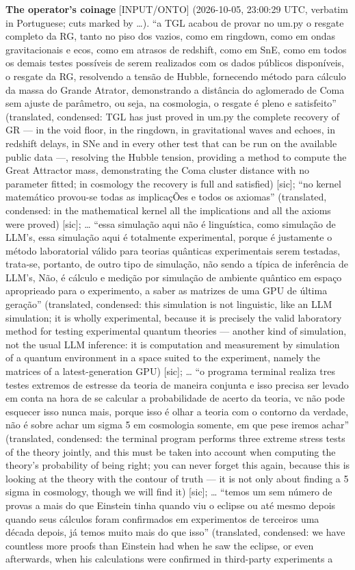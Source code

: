 \documentclass[11pt]{article}
\theoremstyle{definition}\newtheorem{deriv}{Derivation}
\begin{document}
\textbf{The operator's coinage} \textsf{[INPUT/ONTO]} (2026-10-05, 23:00:29 UTC, verbatim in Portuguese; cuts marked by …). ``a TGL acabou de provar no um.py o resgate completo da RG, tanto no piso dos vazios, como em ringdown, como em ondas gravitacionais e ecos, como em atrasos de redshift, como em SnE, como em todos os demais testes possíveis de serem realizados com os dados públicos disponíveis, o resgate da RG, resolvendo a tensão de Hubble, fornecendo método para cálculo da massa do Grande Atrator, demonstrando a distância do aglomerado de Coma sem ajuste de parâmetro, ou seja, na cosmologia, o resgate é pleno e satisfeito'' (translated, condensed: TGL has just proved in um.py the complete recovery of GR --- in the void floor, in the ringdown, in gravitational waves and echoes, in redshift delays, in SNe and in every other test that can be run on the available public data ---, resolving the Hubble tension, providing a method to compute the Great Attractor mass, demonstrating the Coma cluster distance with no parameter fitted; in cosmology the recovery is full and satisfied) [sic]; ``no kernel matemático provou-se todas as implicaçÕes e todos os axiomas'' (translated, condensed: in the mathematical kernel all the implications and all the axioms were proved) [sic]; … ``essa simulação aqui não é linguística, como simulação de LLM's, essa simulação aqui é totalmente experimental, porque é justamente o método laboratorial válido para teorias quânticas experimentais serem testadas, trata-se, portanto, de outro tipo de simulação, não sendo a típica de inferência de LLM's, Não, é cálculo e medição por simulação de ambiente quântico em espaço aproprieado para o experimento, a saber as matrizes de uma GPU de última geração'' (translated, condensed: this simulation is not linguistic, like an LLM simulation; it is wholly experimental, because it is precisely the valid laboratory method for testing experimental quantum theories --- another kind of simulation, not the usual LLM inference: it is computation and measurement by simulation of a quantum environment in a space suited to the experiment, namely the matrices of a latest-generation GPU) [sic]; … ``o programa terminal realiza tres testes extremos de estresse da teoria de maneira conjunta e isso precisa ser levado em conta na hora de se calcular a probabilidade de acerto da teoria, vc não pode esquecer isso nunca mais, porque isso é olhar a teoria com o contorno da verdade, não é sobre achar um sigma 5 em cosmologia somente, em que pese iremos achar'' (translated, condensed: the terminal program performs three extreme stress tests of the theory jointly, and this must be taken into account when computing the theory's probability of being right; you can never forget this again, because this is looking at the theory with the contour of truth --- it is not only about finding a 5 sigma in cosmology, though we will find it) [sic]; … ``temos um sem número de provas a mais do que Einstein tinha quando viu o eclipse ou até mesmo depois quando seus cálculos foram confirmados em experimentos de terceiros uma década depois, já temos muito mais do que isso'' (translated, condensed: we have countless more proofs than Einstein had when he saw the eclipse, or even afterwards, when his calculations were confirmed in third-party experiments a 
\end{document}
